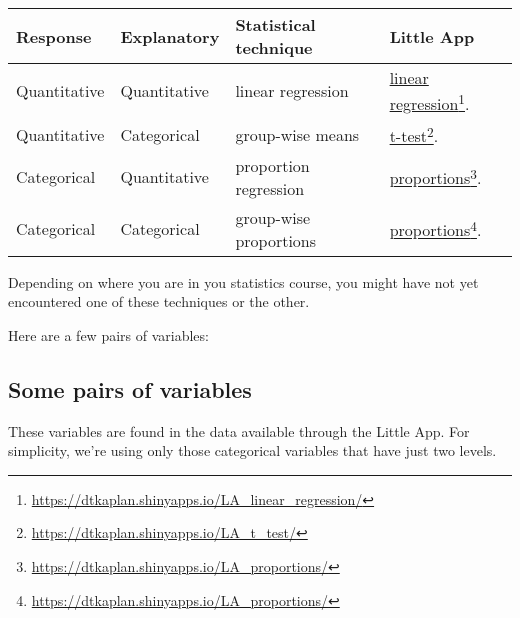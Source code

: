\documentclass[nofonts,]{tufte-handout}
\begin{document}
\begin{longtable}[]{@{}llll@{}}
\toprule
Response & Explanatory & Statistical technique & Little
App\tabularnewline
\midrule
\endhead
Quantitative & Quantitative & linear regression &
\href{https://dtkaplan.shinyapps.io/LA_linear_regression/}{linear
regression}\footnote{\url{https://dtkaplan.shinyapps.io/LA_linear_regression/}}.\tabularnewline
Quantitative & Categorical & group-wise means &
\href{https://dtkaplan.shinyapps.io/LA_t_test/}{t-test}\footnote{\url{https://dtkaplan.shinyapps.io/LA_t_test/}}.\tabularnewline
Categorical & Quantitative & proportion regression &
\href{https://dtkaplan.shinyapps.io/LA_proportions/}{proportions}\footnote{\url{https://dtkaplan.shinyapps.io/LA_proportions/}}.\tabularnewline
Categorical & Categorical & group-wise proportions &
\href{https://dtkaplan.shinyapps.io/LA_proportions/}{proportions}\footnote{\url{https://dtkaplan.shinyapps.io/LA_proportions/}}.\tabularnewline
\bottomrule
\end{longtable}

Depending on where you are in you statistics course, you might have not
yet encountered one of these techniques or the other.

Here are a few pairs of variables:

\hypertarget{some-pairs-of-variables}{%
\subsection{Some pairs of variables}\label{some-pairs-of-variables}}

These variables are found in the data available through the Little App.
For simplicity, we're using only those categorical variables that have
just two levels.
\end{document}
